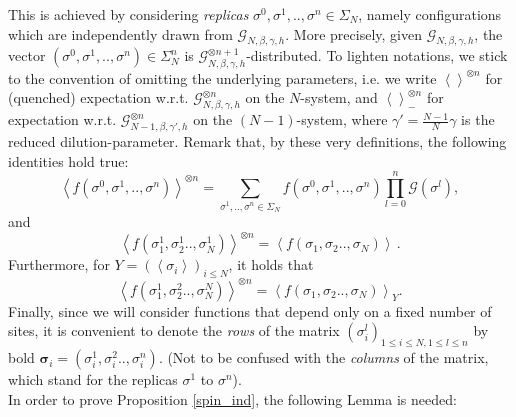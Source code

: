 \documentclass[a4paper,12pt,oneside,reqno]{amsart}
\numberwithin{equation}{section}
\begin{document}
This is achieved by considering {\it replicas} ${\sigma}^0,{\sigma}^1,..,{\sigma}^n \in \Sigma_N$, namely configurations 
which are independently drawn from $\mathcal{G}_{N,\beta,\gamma,h}$. More precisely, given $\mathcal{G}_{N,\beta,\gamma,h}$, the vector $({\sigma}^0,{\sigma}^1,..,{\sigma}^n)\in \Sigma_N^n$ is $\mathcal{G}^{\otimes n+1}_{N,\beta,\gamma,h}$-distributed. To lighten notations, we stick to the convention of omitting the underlying parameters, i.e. we write $\left<\right>^{\otimes n}$ for (quenched) expectation w.r.t. 
$\mathcal{G}^{\otimes n}_{N,\beta,\gamma,h}$ on the $N$-system, and $\left<\right>^{\otimes n}_{-}$ for expectation w.r.t. $\mathcal{G}^{\otimes n}_{N-1,\beta,\gamma', h}$ on the $(N-1)$-system, where $\gamma' = \frac{N-1}{N}\gamma$ is the reduced dilution-parameter. Remark that, by these very definitions,  the following identities hold true: 
\[
\left<f\left(\sigma^0,\sigma^1,..,\sigma^n\right)\right>^{\otimes n} = \sum\limits_{{\sigma}^1,..,{\sigma}^n\in \Sigma_N} f\left(\sigma^0,\sigma^1,..,\sigma^n\right) \prod\limits_{l=0}^{n} \mathcal{G}\left({\sigma}^l\right), 
\]
and
\[
\left<f(\sigma_1^1,\sigma_2^1..,\sigma_N^1)\right>^{\otimes n} =\left<f(\sigma_1,\sigma_2..,\sigma_N)\right> \,.
\] 
Furthermore, for $Y = \left(\left<{\sigma}_i\right>\right)_{i\leq N}$, it holds that 
\[
\left<f(\sigma_1^1,\sigma_2^2..,\sigma_N^N)\right>^{\otimes n} =\left<f(\sigma_1,\sigma_2..,\sigma_N)\right>_Y.
\]
Finally, since we will consider functions that depend only on a fixed number of sites, it is convenient to denote the {\it rows} of the matrix  $\left(\sigma_i^l\right)_{1\leq i\leq N,1\leq l\leq n}$ by bold $\boldsymbol{\sigma}_i= \left(\sigma_i^1,\sigma_i^2..,\sigma_i^n\right)$. (Not to be confused with the {\it columns} of the matrix, which stand for the replicas ${\sigma}^1$ to ${\sigma}^n$). \\

In order to prove Proposition \ref{spin_ind}, the following Lemma is needed: 
\end{document}
